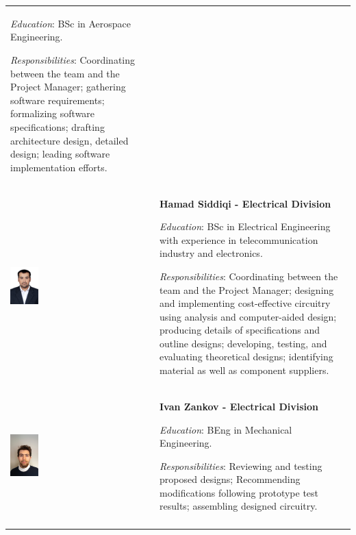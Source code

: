 \documentclass[a4paper,12pt,twoside]{article}
\begin{document}
\begin{longtable}[]{m{} m{}}
\smallskip
\textit{Education}: BSc in Aerospace Engineering.


\smallskip 
\textit{Responsibilities}: Coordinating between the team and the Project Manager; gathering software requirements; formalizing software specifications; drafting architecture design, detailed design; leading software implementation efforts.
\bigskip
\\

\includegraphics[width=0.2\textwidth]{1-introduction/img/hamad-saddiqi.jpg} & \textbf{Hamad Siddiqi - Electrical Division}

\smallskip
\textit{Education}: BSc in Electrical Engineering with experience in telecommunication industry and electronics.

\smallskip
\textit{Responsibilities}: Coordinating between the team and the Project Manager; designing and implementing cost-effective circuitry using analysis and computer-aided design; producing details of specifications and outline designs; developing, testing, and evaluating theoretical designs; identifying material as well as component suppliers. 
\bigskip
\\


\includegraphics[width=0.2\textwidth]{1-introduction/img/ivan-zankov.jpg} & \textbf{Ivan Zankov - Electrical Division}

\smallskip
\textit{Education}: BEng in Mechanical Engineering.

\smallskip
\textit{Responsibilities}: Reviewing and testing proposed designs; Recommending modifications following prototype test results; assembling designed circuitry.                                                          

\\
\label{tab:people}
\end{longtable}
\raggedbottom
\end{document}
